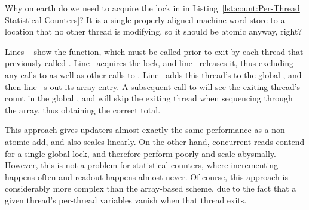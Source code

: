 \QuickQuiz{}
	Why on earth do we need to acquire the lock in
	 in
	Listing~\ref{lst:count:Per-Thread Statistical Counters}?
	It is a single properly aligned machine-word store to a location
	that no other thread is modifying, so it should be atomic anyway,
	right?
 \QuickQuizEnd

\begin{lineref}
Lines~- show the 
function, which
must be called prior to exit by each thread that previously called
.
Line~ acquires the lock, and
line~ releases it, thus excluding any
calls to  as well as other calls to
.
Line~ adds this thread's  to the global
,
and then line~ s out its  array entry.
A subsequent call to  will see the exiting thread's
count in the global , and will skip the exiting thread
when sequencing through the  array, thus obtaining
the correct total.
\end{lineref}

This approach gives updaters almost exactly the same performance as
a non-atomic add, and also scales linearly.
On the other hand, concurrent reads contend for a single global lock,
and therefore perform poorly and scale abysmally.
However, this is not a problem for statistical counters, where incrementing
happens often and readout happens almost never.
Of course, this approach is considerably more complex than the
array-based scheme, due to the fact that a given thread's per-thread
variables vanish when that thread exits.

